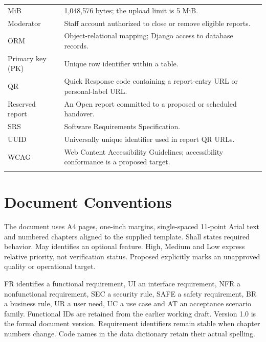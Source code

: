 \documentclass[12pt,a4paper,oneside]{report}
\begin{document}
\begin{longtable}{@{}P{0.27\dimexpr\textwidth-12pt\relax}P{0.73\dimexpr\textwidth-12pt\relax}@{}}
MiB & 1,048,576 bytes; the upload limit is 5 MiB. \\ \addlinespace[3pt]

Moderator & Staff account authorized to close or remove eligible reports. \\ \addlinespace[3pt]

ORM & Object-relational mapping; Django access to database records. \\ \addlinespace[3pt]

Primary key (PK) & Unique row identifier within a table. \\ \addlinespace[3pt]

QR & Quick Response code containing a report-entry URL or personal-label URL. \\ \addlinespace[3pt]

Reserved report & An Open report committed to a proposed or scheduled handover. \\ \addlinespace[3pt]

SRS & Software Requirements Specification. \\ \addlinespace[3pt]

UUID & Universally unique identifier used in report QR URLs. \\ \addlinespace[3pt]

WCAG & Web Content Accessibility Guidelines; accessibility conformance is a proposed target. \\ \addlinespace[3pt]

\end{longtable}


\section{Document Conventions}

The document uses A4 pages, one-inch margins, single-spaced 11-point Arial text and numbered chapters aligned to the supplied template. Shall states required behavior. May identifies an optional feature. High, Medium and Low express relative priority, not verification status. Proposed explicitly marks an unapproved quality or operational target.

FR identifies a functional requirement, UI an interface requirement, NFR a nonfunctional requirement, SEC a security rule, SAFE a safety requirement, BR a business rule, UR a user need, UC a use case and AT an acceptance scenario family. Functional IDs are retained from the earlier working draft. Version 1.0 is the formal document version. Requirement identifiers remain stable when chapter numbers change. Code names in the data dictionary retain their actual spelling.
\end{document}
